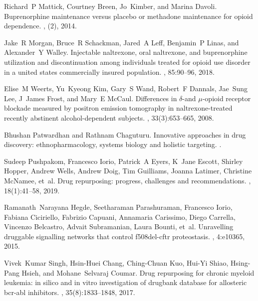 \documentclass[10pt]{article}
\begin{document}
\begin{thebibliography}{10}
			Richard~P Mattick, Courtney Breen, Jo~Kimber, and Marina Davoli.
			\newblock Buprenorphine maintenance versus placebo or methadone maintenance for
			opioid dependence.
			, (2), 2014.
			
			Jake~R Morgan, Bruce~R Schackman, Jared~A Leff, Benjamin~P Linas, and
			Alexander~Y Walley.
			\newblock Injectable naltrexone, oral naltrexone, and buprenorphine utilization
			and discontinuation among individuals treated for opioid use disorder in a
			united states commercially insured population.
			, 85:90--96, 2018.
			
			Elise~M Weerts, Yu~Kyeong Kim, Gary~S Wand, Robert~F Dannals, Jae~Sung Lee,
			J~James Frost, and Mary~E McCaul.
			\newblock Differences in $\delta$-and $\mu$-opioid receptor blockade measured
			by positron emission tomography in naltrexone-treated recently abstinent
			alcohol-dependent subjects.
			, 33(3):653--665, 2008.
			
			Bhushan Patwardhan and Rathnam Chaguturu.
			\newblock Innovative approaches in drug discovery: ethnopharmacology, systems
			biology and holistic targeting.
			.
			
			Sudeep Pushpakom, Francesco Iorio, Patrick~A Eyers, K~Jane Escott, Shirley
			Hopper, Andrew Wells, Andrew Doig, Tim Guilliams, Joanna Latimer, Christine
			McNamee, et~al.
			\newblock Drug repurposing: progress, challenges and recommendations.
			, 18(1):41--58, 2019.
			
			Ramanath~Narayana Hegde, Seetharaman Parashuraman, Francesco Iorio, Fabiana
			Ciciriello, Fabrizio Capuani, Annamaria Carissimo, Diego Carrella, Vincenzo
			Belcastro, Advait Subramanian, Laura Bounti, et~al.
			\newblock Unravelling druggable signalling networks that control f508del-cftr
			proteostasis.
			, 4:e10365, 2015.
			
			Vivek~Kumar Singh, Hsin-Huei Chang, Ching-Chuan Kuo, Hui-Yi Shiao, Hsing-Pang
			Hsieh, and Mohane~Selvaraj Coumar.
			\newblock Drug repurposing for chronic myeloid leukemia: in silico and in vitro
			investigation of drugbank database for allosteric bcr-abl inhibitors.
			,
			35(8):1833--1848, 2017.
			

\end{thebibliography}
\end{document}
